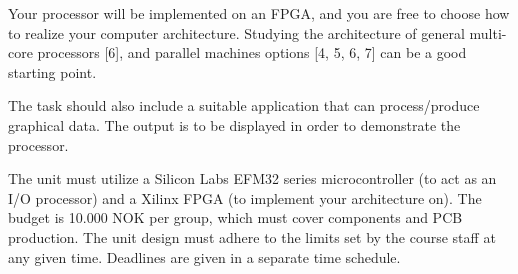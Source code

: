 Your processor will be implemented on an FPGA, and you are free to choose how to realize your computer architecture.
Studying the architecture of general multi-core processors [6], and parallel machines options [4, 5, 6, 7] can be a good starting point.


The task should also include a suitable application that can process/produce graphical data.
The output is to be displayed in order to demonstrate the processor.

The unit must utilize a Silicon Labs EFM32 series microcontroller (to act as an I/O processor) and a Xilinx FPGA (to implement your architecture on).
The budget is 10.000 NOK per group, which must cover components and PCB production.
The unit design must adhere to the limits set by the course staff at any given time.
Deadlines are given in a separate time schedule.
